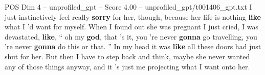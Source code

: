\begin{textsample}{POS Dim 4 – unprofiled\_gpt – Score 4.00 – unprofiled\_gpt/t001406\_gpt.txt}  \label{ex:f4_pos_021}
I just instinctively feel really \textbf{sorry} for her, though, because her life is nothing \textbf{like} what I ’d want for myself.
When I found out she was pregnant I just cried, I was devastated, \textbf{like}, “ oh my \textbf{god}, that ’s it, you ’re never \textbf{gonna} go travelling, you ’re never \textbf{gonna} do this or that. ” In my head it was \textbf{like} all these doors had just shut for her.
But then I have to step back and think, maybe she never wanted any of those things anyway, and it ’s just me projecting what I want onto her.

\end{textsample}
